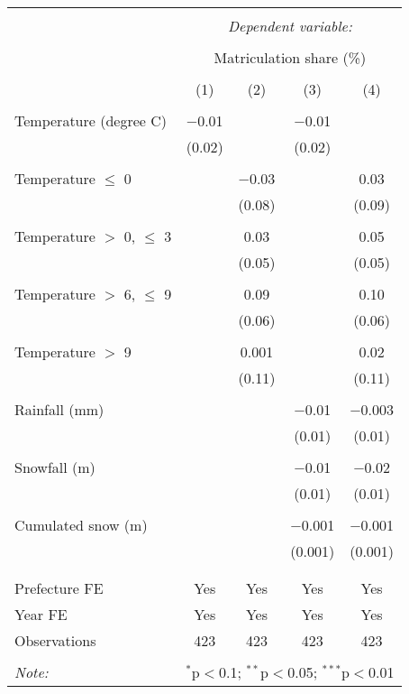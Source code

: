 
\begin{tabular}{@{\extracolsep{5pt}}lcccc} 
\\[-1.8ex]\hline 
\hline \\[-1.8ex] 
 & \multicolumn{4}{c}{\textit{Dependent variable:}} \\ 
\cline{2-5} 
\\[-1.8ex] & \multicolumn{4}{c}{Matriculation share (\%)} \\ 
\\[-1.8ex] & (1) & (2) & (3) & (4)\\ 
\hline \\[-1.8ex] 
 Temperature (degree C) & $-$0.01 &  & $-$0.01 &  \\ 
  & (0.02) &  & (0.02) &  \\ 
  & & & & \\ 
 Temperature $\le$ 0 &  & $-$0.03 &  & 0.03 \\ 
  &  & (0.08) &  & (0.09) \\ 
  & & & & \\ 
 Temperature $>$ 0, $\le$ 3 &  & 0.03 &  & 0.05 \\ 
  &  & (0.05) &  & (0.05) \\ 
  & & & & \\ 
 Temperature $>$ 6, $\le$ 9 &  & 0.09 &  & 0.10 \\ 
  &  & (0.06) &  & (0.06) \\ 
  & & & & \\ 
 Temperature $>$ 9 &  & 0.001 &  & 0.02 \\ 
  &  & (0.11) &  & (0.11) \\ 
  & & & & \\ 
 Rainfall (mm) &  &  & $-$0.01 & $-$0.003 \\ 
  &  &  & (0.01) & (0.01) \\ 
  & & & & \\ 
 Snowfall (m) &  &  & $-$0.01 & $-$0.02 \\ 
  &  &  & (0.01) & (0.01) \\ 
  & & & & \\ 
 Cumulated snow (m) &  &  & $-$0.001 & $-$0.001 \\ 
  &  &  & (0.001) & (0.001) \\ 
  & & & & \\ 
\hline \\[-1.8ex] 
Prefecture FE & Yes & Yes & Yes & Yes \\ 
Year FE & Yes & Yes & Yes & Yes \\ 
Observations & 423 & 423 & 423 & 423 \\ 
\hline 
\hline \\[-1.8ex] 
\textit{Note:}  & \multicolumn{4}{r}{$^{*}$p$<$0.1; $^{**}$p$<$0.05; $^{***}$p$<$0.01} \\ 
\end{tabular} 
